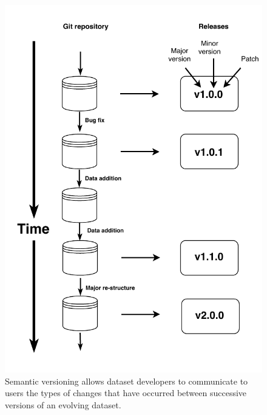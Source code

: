 \documentclass[a4paper,num-refs]{assets/oup-contemporary}
\begin{document}
\begin{figure}[!t]
\centering
\includegraphics[width=\linewidth]{figures/Figure-versions.pdf}
\caption{
Semantic versioning allows dataset developers to communicate to users the types of changes that have occurred between successive versions of an evolving dataset.}
\label{fig:semantic}
\end{figure}
\end{document}
